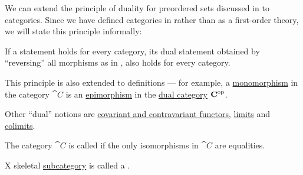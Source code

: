 \begin{remark}\label{thm:categorical_principle_of_duality}
  We can extend the principle of duality for preordered sets discussed in  to categories. Since we have defined categories in \hyperref[def:axiom_of_universes]{} rather than as a first-order theory, we will state this principle informally:
  \begin{displayquote}
    If a statement holds for every category, its dual statement obtained by \enquote{reversing} all morphisms as in , also holds for every category.
  \end{displayquote}

  This principle is also extended to definitions --- for example, a \hyperref[def:morphism_invertibility/monomorphism]{monomorphism} in the category \( \cat{C} \) is an \hyperref[def:morphism_invertibility/epimorphism]{epimorphism} in the \hyperref[def:dual_category]{dual category} \( \operatorname{\mathbf{C}}^{\operatorname{op}} \).

  Other \enquote{dual} notions are \hyperref[def:contravariant_functor]{covariant and contravariant functors}, \hyperref[def:categorical_limit]{limits} and \hyperref[def:categorical_colimit]{colimits}.
\end{remark}

\begin{definition}\label{def:skeletal_category}
  The category \( \cat{C} \) is called  if the only isomorphisms in \( \cat{C} \) are equalities.

  X skeletal \hyperref[def:subcategory]{subcategory} is called a .
\end{definition}

